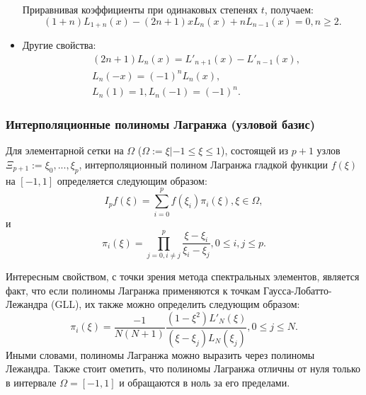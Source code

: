\begin{itemize}
    Приравнивая коэффициенты при одинаковых степенях $t$, получаем:
    \begin{equation*}
        (1+n)L_{1+n}(x)-(2n+1)xL_n(x)+nL_{n-1}(x) = 0, n \geq 2.
    \end{equation*}

    \item Другие свойства:
    \begin{equation*}
        \begin{aligned}
        & (2n+1)L_n(x)=L'_{n+1}(x) - L'_{n-1}(x), \\
        & L_n(-x) = (-1)^nL_n(x), \\
        & L_n(1) = 1, L_n(-1) = (-1)^n.
        \end{aligned}
    \end{equation*}

\end{itemize}

\subsubsection{Интерполяционные полиномы Лагранжа (узловой базис)}

Для элементарной сетки на $\Omega$ ($\Omega := {\xi |  −1 \leq \xi \leq 1}$), состоящей из $p + 1$ узлов 
$\Xi_{p+1} := \xi_0,...,\xi_p$, интерполяционный полином Лагранжа гладкой функции $f(\xi)$ на $[-1, 1]$ 
определяется следующим образом:
%
\begin{equation*}
    I_p f(\xi) = \sum^{p}_{i=0} f(\xi_i)\pi_i(\xi), \xi \in \Omega,
\end{equation*}
%
и
%
\begin{equation*}
    \pi_i(\xi) = \prod^{p}_{j=0, i \neq j} \frac{\xi - \xi_i}{\xi_i - \xi_j}, 0 \leq i,j \leq p.
\end{equation*}

Интересным свойством, с точки зрения метода спектральных элементов, является факт, что 
если полиномы Лагранжа применяются к точкам Гаусса-Лобатто-Лежандра (GLL), 
их также можно определить следующим образом:
%
\begin{equation*}
    \pi_i(\xi) = \frac{-1}{N(N+1)} \frac{(1-\xi^2)L'_N(\xi)}{(\xi-\xi_j)L_N(\xi_j)}, 0 \leq j \leq N.
\end{equation*}
%
Иными словами, полиномы Лагранжа можно выразить через полиномы Лежандра.
%
Также стоит ометить, что полиномы Лагранжа отличны от нуля только в интервале $\Omega = [-1, 1]$ 
и обращаются в ноль за его пределами.
%


